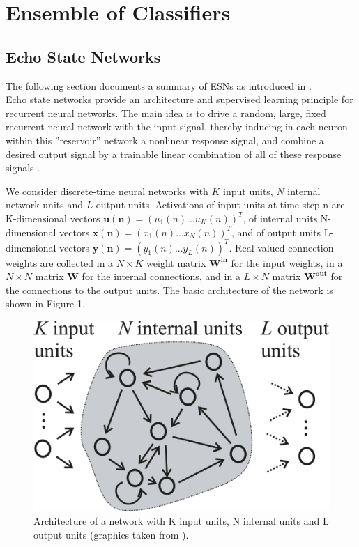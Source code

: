 \documentclass[a4paper,11pt,oneside]{article}
\begin{document}
\section{Ensemble of Classifiers}
\subsection{Echo State Networks}
The following section documents a summary of ESNs as introduced in \cite{spedia,jaeg6,jaeg7}.\\
Echo state networks provide an architecture and supervised learning principle for recurrent neural networks.
The main idea is to drive a random, large, fixed recurrent neural network with the input signal, 
thereby inducing in each neuron within this ”reservoir” network a nonlinear response signal, 
and combine a desired output signal by a trainable linear combination of all of these response signals \cite{spedia}.

We consider discrete-time neural networks with $K$ input units, $N$ internal network units and $L$ output units. 
Activations of input units at time step n are K-dimensional vectors $\mathbf{u(n)} = (u_1(n)...u_K(n))^T$, of internal
units N-dimensional vectors $\mathbf{x(n)} = (x_1(n)...x_N(n))^T$, and of output units L-dimensional vectors 
$\mathbf{y(n)} = (y_1(n)...y_L(n))^T$. Real-valued connection weights are collected in a $N\times K$ weight matrix 
$\mathbf{W^{in}}$ for the input weights, in a $N\times N$ matrix $\mathbf{W}$ for the internal connections, and in a 
$L\times N$ matrix $\mathbf{W^{out}}$ for the connections to the output units. 
The basic architecture of the network is shown in Figure 1.
\begin{figure}[h]
\includegraphics[scale = 0.5]{architecture}
\centering
\caption{Architecture of a network with K input units, N internal units and L output units (graphics 
taken from \cite{jaeg7}).}
\end{figure}
\end{document}
